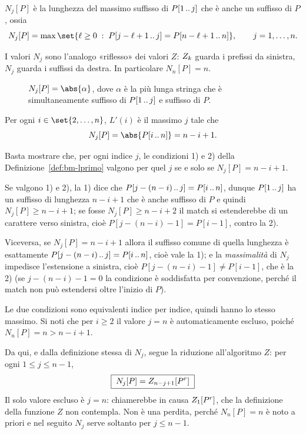 \begin{definizione}[{{$N_j[P]$}}]\label{def:bm-nj}
$N_j[P]$ è la lunghezza del massimo suffisso di $P[1\,..\,j]$ che è anche un
suffisso di $P$, ossia
\[
  N_j[P]=\max\set{\ell\ge 0 \;:\; \sub{P}{j-\ell+1}{j}=\sub{P}{n-\ell+1}{n}},
  \qquad j=1,\dots,n .
\]
\end{definizione}

I valori $N_j$ sono l'analogo «riflesso» dei valori $Z$: $Z_{k}$ guarda i prefissi
da sinistra, $N_j$ guarda i suffissi da destra. In particolare $N_n[P]=n$.

\begin{figure}[H]
\centering

\caption{$N_j[P]=\abs{\alpha}$, dove $\alpha$ è la più lunga stringa che è
simultaneamente suffisso di $P[1\,..\,j]$ e suffisso di $P$.}
\end{figure}

\begin{teorema}\label{thm:bm-lprimo-nj}
Per ogni $i\in\set{2,\dots,n}$, $L'(i)$ è il massimo $j$ tale che
\[
  N_j[P]=\abs{\sub{P}{i}{n}}=n-i+1 .
\]
\end{teorema}

\begin{dimostrazione}
Basta mostrare che, per ogni indice $j$, le condizioni 1) e 2) della
Definizione~\ref{def:bm-lprimo} valgono per quel $j$ se e solo se $N_j[P]=n-i+1$.

Se valgono 1) e 2), la 1) dice che $P[j-(n-i)\,..\,j]=P[i\,..\,n]$, dunque
$P[1\,..\,j]$ ha un suffisso di lunghezza $n-i+1$ che è anche suffisso di $P$ e
quindi $N_j[P]\ge n-i+1$; se fosse $N_j[P]\ge n-i+2$ il match si estenderebbe di un
carattere verso sinistra, cioè $P[j-(n-i)-1]=P[i-1]$, contro la 2).

Viceversa, se $N_j[P]=n-i+1$ allora il suffisso comune di quella lunghezza è
esattamente $P[j-(n-i)\,..\,j]=P[i\,..\,n]$, cioè vale la 1); e la
\emph{massimalità} di $N_j$ impedisce l'estensione a sinistra, cioè
$P[j-(n-i)-1]\neq P[i-1]$, che è la 2) (se $j-(n-i)-1=0$ la condizione è soddisfatta
per convenzione, perché il match non può estendersi oltre l'inizio di $P$).

Le due condizioni sono equivalenti indice per indice, quindi hanno lo stesso massimo.
Si noti che per $i\ge 2$ il valore $j=n$ è automaticamente escluso, poiché
$N_n[P]=n>n-i+1$.
\end{dimostrazione}

Da qui, e dalla definizione stessa di $N_j$, segue la riduzione all'algoritmo $Z$:
per ogni $1\le j\le n-1$,
\[
  \boxed{\;N_j[P]=Z_{n-j+1}[P^r]\;}
\]
Il solo valore escluso è $j=n$: chiamerebbe in causa $Z_{1}[P^r]$, che la
definizione della funzione $Z$ non contempla. Non è una perdita, perché
$N_n[P]=n$ è noto a priori e nel seguito $N_j$ serve soltanto per $j\le n-1$.

